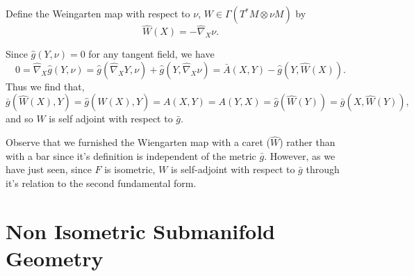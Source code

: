 \documentclass{article}
\begin{document}
Define the Weingarten map with respect to $\nu$, $W \in \Gamma(T^{\ast}M \otimes \nu M)$ by
\[
\hat{W}(X) = - \hat{\nabla}_X \nu.
\]

Since $\hat{g}(Y, \nu) = 0$ for any tangent field, we have
\[
0 = \hat{\nabla}_X \hat{g} (Y, \nu) = \hat{g}(\hat{\nabla}_X Y, \nu) + \hat{g} (Y, \hat{\nabla}_X \nu) = \bar{A}(X, Y) - \hat{g}(Y, \hat{W}(X)).
\]
Thus we find that,
\[
\bar{g} (\hat{W}(X), Y) = \hat{g} (\hat{W}(X), Y) = A(X, Y) = A(Y, X) = \hat{g}(\hat{W}(Y)) = \bar{g}(X, \hat{W}(Y)),
\]
and so $W$ is self adjoint with respect to $\bar{g}$.

Observe that we furnished the Wiengarten map with a caret ($\hat{W}$) rather than with a bar since it's definition is independent of the metric $\bar{g}$. However, as we have just seen, since $F$ is isometric, $W$ is self-adjoint with respect to $\bar{g}$ through it's relation to the second fundamental form. 

\section{Non Isometric Submanifold Geometry}
\end{document}
